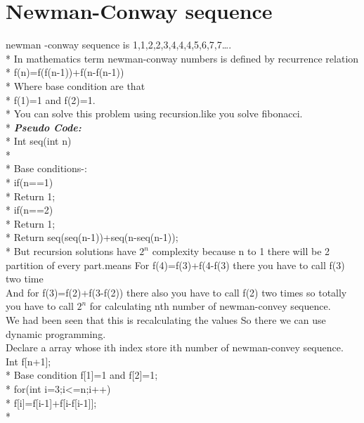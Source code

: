 \documentclass[12pt]{book}
\begin{document}
\chapter{Newman-Conway sequence}
newman -conway sequence is 1,1,2,2,3,4,4,4,5,6,7,7…. \\*
In mathematics term newman-conway numbers is defined by recurrence relation \\*
f(n)=f(f(n-1))+f(n-f(n-1))\\*
Where base condition are that\\* 
f(1)=1 and f(2)=1.\\*
You can solve this problem using recursion.like you solve fibonacci. \\*
\newline
\newline
\textbf{\textit{Pseudo Code:}} \\*
Int seq(int n) \\*
{ \\*
Base conditions-:\\*
if(n==1)\\*
\phantom{x} \hspace{3ex}Return 1;\\*
if(n==2)\\*
\phantom{x} \hspace{3ex}Return 1;\\*
Return seq(seq(n-1))+seq(n-seq(n-1));\\*
}
But recursion solutions have $2^n$ complexity because n to 1 there will be 2 partition of every part.means
For f(4)=f(3)+f(4-f(3) there you have to call f(3) two time \\
\newline
And for f(3)=f(2)+f(3-f(2)) there also you have to call f(2) two times so totally you have to call $2^n$ for calculating nth number of newman-convey sequence.\\
\newline
We had been seen that this is recalculating the values
So there we can use dynamic programming.\\
\newline
Declare a array whose ith index store ith number of newman-convey sequence.\\
\newline
Int f[n+1]; \\*
Base condition f[1]=1 and f[2]=1;\\*
for(int i=3;i<=n;i++)\\*
f[i]=f[i-1]+f[i-f[i-1]];\\*
\end{document}
